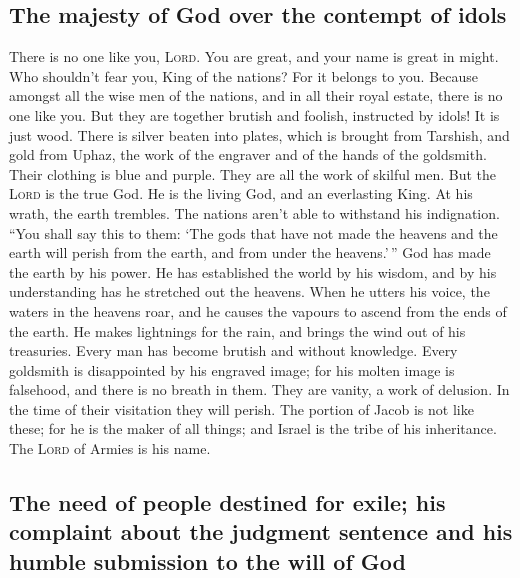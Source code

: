 \hypertarget{the-majesty-of-god-over-the-contempt-of-idols}{%
\subsection{The majesty of God over the contempt of
idols}\label{the-majesty-of-god-over-the-contempt-of-idols}}

 There is no one like you, \textsc{Lord}. You are great,
and your name is great in might.  Who shouldn't fear you,
King of the nations? For it belongs to you. Because amongst all the wise
men of the nations, and in all their royal estate, there is no one like
you.  But they are together brutish and foolish,
instructed by idols! It is just wood.  There is silver
beaten into plates, which is brought from Tarshish, and gold from Uphaz,
the work of the engraver and of the hands of the goldsmith. Their
clothing is blue and purple. They are all the work of skilful men.
 But the \textsc{Lord} is the true God. He is the living
God, and an everlasting King. At his wrath, the earth trembles. The
nations aren't able to withstand his indignation.  ``You
shall say this to them: `The gods that have not made the heavens and the
earth will perish from the earth, and from under the heavens.'\,''
 God has made the earth by his power. He has established
the world by his wisdom, and by his understanding has he stretched out
the heavens.  When he utters his voice, the waters in the
heavens roar, and he causes the vapours to ascend from the ends of the
earth. He makes lightnings for the rain, and brings the wind out of his
treasuries.  Every man has become brutish and without
knowledge. Every goldsmith is disappointed by his engraved image; for
his molten image is falsehood, and there is no breath in them.
 They are vanity, a work of delusion. In the time of
their visitation they will perish.  The portion of Jacob
is not like these; for he is the maker of all things; and Israel is the
tribe of his inheritance. The \textsc{Lord} of Armies is his name.

\hypertarget{the-need-of-people-destined-for-exile-his-complaint-about-the-judgment-sentence-and-his-humble-submission-to-the-will-of-god}{%
\subsection{The need of people destined for exile; his complaint about
the judgment sentence and his humble submission to the will of
God}\label{the-need-of-people-destined-for-exile-his-complaint-about-the-judgment-sentence-and-his-humble-submission-to-the-will-of-god}}

